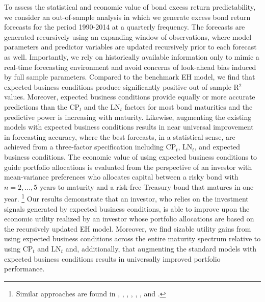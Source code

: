 \documentclass[12pt,letterpaper,leqno,doublespacing]{article}
\begin{document}
To assess the statistical and economic value of bond excess return predictability, we consider an out-of-sample analysis in which we generate excess bond return forecasts for the period 1990-2014 at a quarterly frequency. The forecasts are generated recursively using an expanding window of observations, where model parameters and predictor variables are updated recursively prior to each forecast as well. Importantly, we rely on historically available information only to mimic a real-time forecasting environment and avoid concerns of look-ahead bias induced by full sample parameters. Compared to the benchmark EH model, we find that expected business conditions produce significantly positive out-of-sample R$^{2}$ values. Moreover, expected business conditions provide equally or more accurate predictions than the CP$_{t}$ and the LN$_{t}$ factors for most bond maturities and the predictive power is increasing with maturity. Likewise, augmenting the existing models with expected business conditions results in near universal improvement in forecasting accuracy, where the best forecasts, in a statistical sense, are achieved from a three-factor specification including CP$_{t}$, LN$_{t}$, and expected business conditions. The economic value of using expected business conditions to guide portfolio allocations is evaluated from the perspective of an investor with mean-variance preferences who allocates capital between a risky bond with $n=2,\ldots,5$ years to maturity and a risk-free Treasury bond that matures in one year.%
\footnote{Similar approaches are found in \cite{CampbellThompson2008}, \cite{DanglHalling2012}, \cite{ThorntonValente2012}, \cite{RapachZhou2013}, \cite{GarganoPettenuzzoTimmermann2014}, \cite{SarnoSchneiderWagner2014}, and \cite{Zhu2015}.}
%
Our results demonstrate that an investor, who relies on the investment signals generated by expected business conditions, is able to improve upon the economic utility realized by an investor whose portfolio allocations are based on the recursively updated EH model. Moreover, we find sizable utility gains from using expected business conditions across the entire maturity spectrum relative to using CP$_{t}$ and LN$_{t}$ and, additionally, that augmenting the standard models with expected business conditions results in universally improved portfolio performance.
\end{document}
